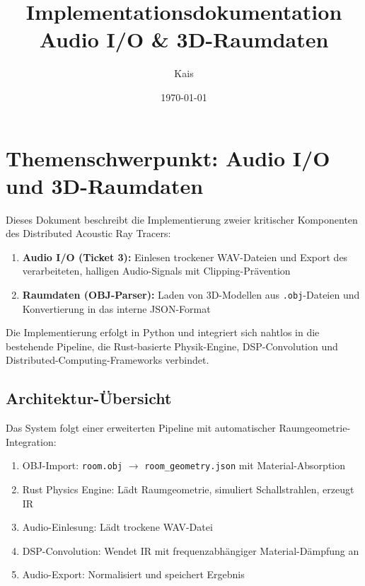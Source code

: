 \documentclass[11pt,a4paper,twoside]{report}
\title{\Huge\textbf{Implementationsdokumentation}\\[0.3cm]
       \Large Audio I/O \& 3D-Raumdaten}
\author{Kais}
\date{\today}
\begin{document}
\maketitle
\tableofcontents
\newpage

\chapter{Themenschwerpunkt: Audio I/O und 3D-Raumdaten}

Dieses Dokument beschreibt die Implementierung zweier kritischer Komponenten des Distributed Acoustic Ray Tracers:

\begin{enumerate}
    \item \textbf{Audio I/O (Ticket 3):} Einlesen trockener WAV-Dateien und Export des verarbeiteten, halligen Audio-Signals mit Clipping-Pr\"avention
    \item \textbf{Raumdaten (OBJ-Parser):} Laden von 3D-Modellen aus \texttt{.obj}-Dateien und Konvertierung in das interne JSON-Format
\end{enumerate}

Die Implementierung erfolgt in Python und integriert sich nahtlos in die bestehende Pipeline, die Rust-basierte Physik-Engine, DSP-Convolution und Distributed-Computing-Frameworks verbindet.

\section{Architektur-\"Ubersicht}

Das System folgt einer erweiterten Pipeline mit automatischer Raumgeometrie-Integration:

\begin{enumerate}
    \item[\textbf{[0/4]}] OBJ-Import: \texttt{room.obj} $\to$ \texttt{room\_geometry.json} mit Material-Absorption
    \item[\textbf{[1/4]}] Rust Physics Engine: L\"adt Raumgeometrie, simuliert Schallstrahlen, erzeugt IR
    \item[\textbf{[2/4]}] Audio-Einlesung: L\"adt trockene WAV-Datei
    \item[\textbf{[3/4]}] DSP-Convolution: Wendet IR mit frequenzabh\"angiger Material-D\"ampfung an
    \item[\textbf{[4/4]}] Audio-Export: Normalisiert und speichert Ergebnis
\end{enumerate}
\end{document}
